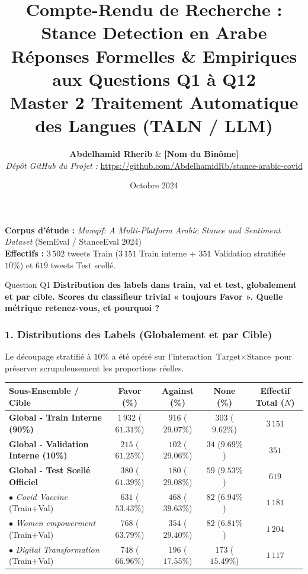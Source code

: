 \documentclass[11pt,a4paper]{article}
\title{\vspace{-1.2cm}\Huge\textbf{\color{primary}Compte-Rendu de Recherche : Stance Detection en Arabe}\\[0.3cm]
\Large\textbf{Réponses Formelles \& Empiriques aux Questions Q1 à Q12}\\[0.2cm]
\large Master 2 Traitement Automatique des Langues (TALN / LLM)}
\author{\textbf{Abdelhamid Rherib} \quad \& \quad \textbf{[Nom du Binôme]} \\
\textit{Dépôt GitHub du Projet :} \url{https://github.com/AbdelhamidRb/stance-arabic-covid}}
\date{Octobre 2024}
\begin{document}
\maketitle

\vspace{-0.3cm}
\begin{center}
\small\textbf{Corpus d'étude :} \textit{Mawqif: A Multi-Platform Arabic Stance and Sentiment Dataset} (SemEval / StanceEval 2024) \\
\textbf{Effectifs :} $3\,502$ tweets Train ($3\,151$ Train interne + $351$ Validation stratifiée $10\%$) et $619$ tweets Test scellé.
\end{center}
\vspace{0.2cm}

\begin{questionbox}{Question Q1}
\textbf{Distribution des labels dans train, val et test, globalement et par cible. Scores du classifieur trivial « toujours Favor ». Quelle métrique retenez-vous, et pourquoi ?}
\end{questionbox}

\subsubsection*{1. Distributions des Labels (Globalement et par Cible)}
Le découpage stratifié à $10\%$ a été opéré sur l'interaction $\text{Target} \times \text{Stance}$ pour préserver scrupuleusement les proportions réelles.

\begin{table}[htbp]
\centering
\small
\begin{tabularx}{\textwidth}{lcccc}
\toprule
\textbf{Sous-Ensemble / Cible} & \textbf{Favor (\%)} & \textbf{Against (\%)} & \textbf{None (\%)} & \textbf{Effectif Total ($N$)} \\
\midrule
\textbf{Global - Train Interne (90\%)} & $1\,932$ ($61.31\%$) & $916$ ($29.07\%$) & $303$ ($9.62\%$) & $3\,151$ \\
\textbf{Global - Validation Interne (10\%)} & $215$ ($61.25\%$) & $102$ ($29.06\%$) & $34$ ($9.69\%$) & $351$ \\
\textbf{Global - Test Scellé Officiel} & $380$ ($61.39\%$) & $180$ ($29.08\%$) & $59$ ($9.53\%$) & $619$ \\
\midrule
$\bullet$ \textit{Covid Vaccine} (Train+Val) & $631$ ($53.43\%$) & $468$ ($39.63\%$) & $82$ ($6.94\%$) & $1\,181$ \\
$\bullet$ \textit{Women empowerment} (Train+Val) & $768$ ($63.79\%$) & $354$ ($29.40\%$) & $82$ ($6.81\%$) & $1\,204$ \\
$\bullet$ \textit{Digital Transformation} (Train+Val) & $748$ ($66.96\%$) & $196$ ($17.55\%$) & $173$ ($15.49\%$) & $1\,117$ \\
\bottomrule
\end{tabularx}
\end{table}
\end{document}
